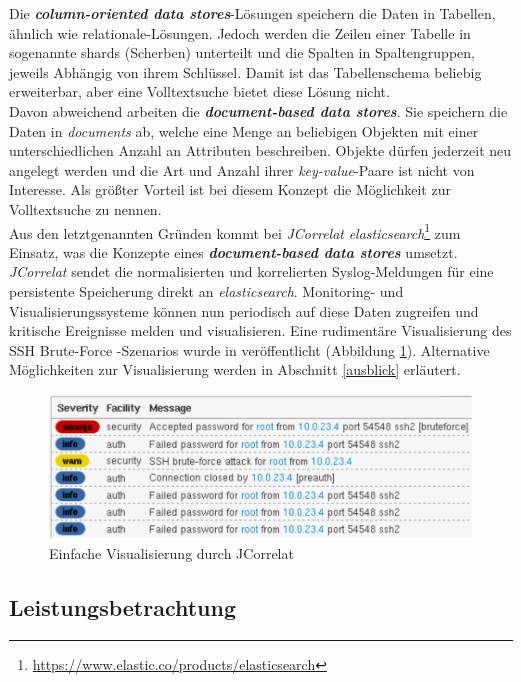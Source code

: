 Die \textbf{\emph{column-oriented data stores}}-Lösungen speichern die Daten in Tabellen, 
ähnlich wie relationale-Lösungen. Jedoch werden die Zeilen einer Tabelle in sogenannte 
shards (Scherben) unterteilt und die Spalten in Spaltengruppen, jeweils Abhängig von 
ihrem Schlüssel. Damit ist das Tabellenschema beliebig erweiterbar, aber eine 
Volltextsuche bietet diese Lösung nicht.\\

Davon abweichend arbeiten die \textbf{\emph{document-based data stores}}. Sie speichern 
die Daten in \textit{documents} ab, welche eine Menge an beliebigen Objekten mit einer 
unterschiedlichen Anzahl an Attributen beschreiben. Objekte dürfen jederzeit neu 
angelegt werden und die Art und Anzahl ihrer \textit{key-value}-Paare ist nicht von 
Interesse. Als größter Vorteil ist bei diesem Konzept die Möglichkeit zur Volltextsuche 
zu nennen.\\

Aus den letztgenannten Gründen kommt bei \textit{JCorrelat} 
\textit{elasticsearch}\footnote{\url{https://www.elastic.co/products/elasticsearch}} zum 
Einsatz, was die Konzepte eines \textbf{\emph{document-based data stores}} umsetzt. 
\textit{JCorrelat} sendet die normalisierten und korrelierten Syslog-Meldungen für eine 
persistente Speicherung direkt an \textit{elasticsearch}. Monitoring- und 
Visualisierungssysteme können nun periodisch auf diese Daten zugreifen und kritische 
Ereignisse melden und visualisieren. Eine rudimentäre Visualisierung des SSH Brute-Force 
-Szenarios wurde in \cite{reissmann} veröffentlicht (Abbildung \ref{pic:logvis}). 
Alternative Möglichkeiten zur Visualisierung werden in Abschnitt \ref{ausblick} 
erläutert. 

\begin{figure}[htbp]
    \caption{Einfache Visualisierung durch JCorrelat}
    \label{pic:logvis}\vspace{0.2cm}
    \centering
    \includegraphics[scale=0.42]{img/correlat-ui}  
\end{figure}
\newpage
\subsection{Leistungsbetrachtung}\label{performance}

